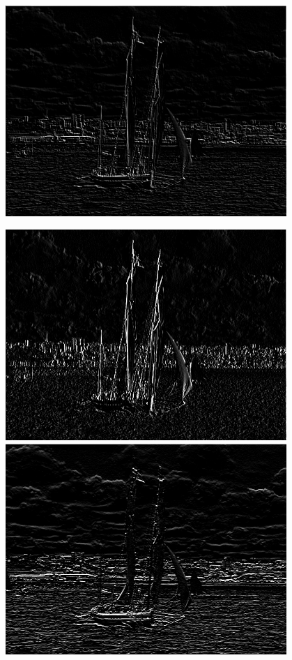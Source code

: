 \documentclass[12pt]{article}
\begin{document}
\begin{minipage}{\textwidth}
\begin{minipage}{0.49\textwidth}
		\includegraphics[width=0.8\textwidth]{IAcBBqAmEI_blended-0.jpeg}
		\captionsetup{width=.8\textwidth}
	\end{minipage}
	\begin{minipage}{0.49\textwidth}
		\centering
		\includegraphics[width=0.8\textwidth]{IAcBBqAmEI_horizontal-1.jpeg}
		\includegraphics[width=0.8\textwidth]{IAcBBqAmEI_vertical-1.jpeg}

\end{minipage}
\end{minipage}
\end{document}
